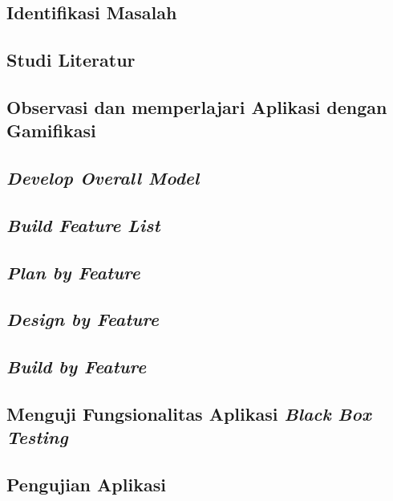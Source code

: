 \subsection{Identifikasi Masalah}
\subsection{Studi Literatur}
\subsection{Observasi dan memperlajari Aplikasi dengan Gamifikasi}
\subsection{\textit{Develop Overall Model}}
\subsection{\textit{Build Feature List}}
\subsection{\textit{Plan by Feature}}
\subsection{\textit{Design by Feature}}
\subsection{\textit{Build by Feature}}
\subsection{Menguji Fungsionalitas Aplikasi \textit{Black Box Testing}}
\subsection{Pengujian Aplikasi}

